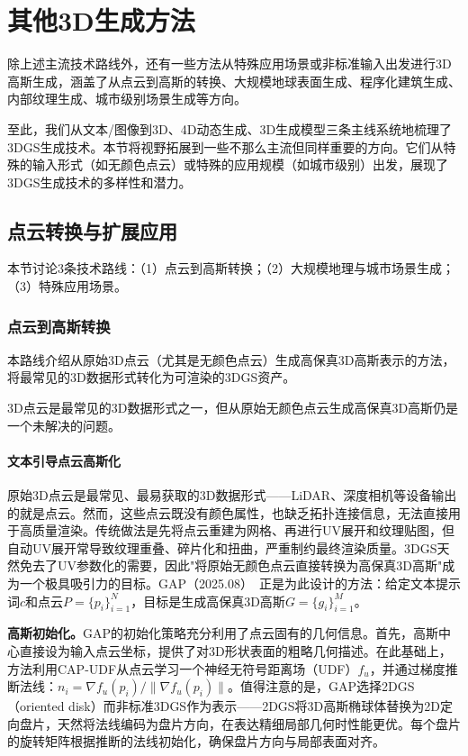 

\section{其他3D生成方法}
\label{sec:08_5}

除上述主流技术路线外，还有一些方法从特殊应用场景或非标准输入出发进行3D高斯生成，涵盖了从点云到高斯的转换、大规模地球表面生成、程序化建筑生成、内部纹理生成、城市级别场景生成等方向。

至此，我们从文本/图像到3D、4D动态生成、3D生成模型三条主线系统地梳理了3DGS生成技术。本节将视野拓展到一些不那么主流但同样重要的方向。它们从特殊的输入形式（如无颜色点云）或特殊的应用规模（如城市级别）出发，展现了3DGS生成技术的多样性和潜力。

\subsection{点云转换与扩展应用}
\label{sec:08_5_1}

本节讨论3条技术路线：（1）点云到高斯转换；（2）大规模地理与城市场景生成；（3）特殊应用场景。

\subsubsection{点云到高斯转换}

本路线介绍从原始3D点云（尤其是无颜色点云）生成高保真3D高斯表示的方法，将最常见的3D数据形式转化为可渲染的3DGS资产。

3D点云是最常见的3D数据形式之一，但从原始无颜色点云生成高保真3D高斯仍是一个未解决的问题。

\paragraph{文本引导点云高斯化}

原始3D点云是最常见、最易获取的3D数据形式——LiDAR、深度相机等设备输出的就是点云。然而，这些点云既没有颜色属性，也缺乏拓扑连接信息，无法直接用于高质量渲染。传统做法是先将点云重建为网格、再进行UV展开和纹理贴图，但自动UV展开常导致纹理重叠、碎片化和扭曲，严重制约最终渲染质量。3DGS天然免去了UV参数化的需要，因此"将原始无颜色点云直接转换为高保真3D高斯"成为一个极具吸引力的目标。GAP（2025.08）~\cite{2508_05631}正是为此设计的方法：给定文本提示词$c$和点云$P = \{p_i\}_{i=1}^N$，目标是生成高保真3D高斯$G = \{g_i\}_{i=1}^M$。

\textbf{高斯初始化。}GAP的初始化策略充分利用了点云固有的几何信息。首先，高斯中心直接设为输入点云坐标，提供了对3D形状表面的粗略几何描述。在此基础上，方法利用CAP-UDF从点云学习一个神经无符号距离场（UDF）$f_u$，并通过梯度推断法线：$n_i = \nabla f_u(p_i) / \|\nabla f_u(p_i)\|$。值得注意的是，GAP选择2DGS（oriented disk）而非标准3DGS作为表示——2DGS将3D高斯椭球体替换为2D定向盘片，天然将法线编码为盘片方向，在表达精细局部几何时性能更优。每个盘片的旋转矩阵根据推断的法线初始化，确保盘片方向与局部表面对齐。

